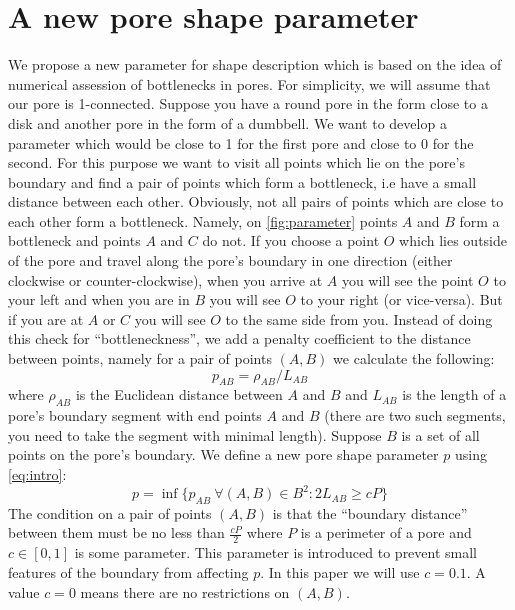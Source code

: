 \documentclass[reprint,amsmath,amssymb,aps,pre,showkeys,showpacs]{revtex4-1}
\begin{document}
\section{A new pore shape parameter}
We propose a new parameter for shape description which is based on the idea of
numerical assession of bottlenecks in pores. For simplicity, we will assume
that our pore is 1-connected. Suppose you have a round pore in the form close to
a disk and another pore in the form of a dumbbell. We want to develop a
parameter which would be close to 1 for the first pore and close to 0 for the
second. For this purpose we want to visit all points which lie on the pore's
boundary and find a pair of points which form a bottleneck, i.e have a small
distance between each other. Obviously, not all pairs of points which are close
to each other form a bottleneck. Namely, on \cref{fig:parameter} points $A$ and
$B$ form a bottleneck and points $A$ and $C$ do not. If you choose a point $O$
which lies outside of the pore and travel along the pore's boundary in one
direction (either clockwise or counter-clockwise), when you arrive at $A$ you
will see the point $O$ to your left and when you are in $B$ you will see $O$ to
your right (or vice-versa). But if you are at $A$ or $C$ you will see $O$ to the
same side from you. Instead of doing this check for ``bottleneckness'', we add a
penalty coefficient to the distance between points, namely for a pair of points
$(A, B)$ we calculate the following:
\begin{equation}
  p_{AB} = \rho_{AB} / L_{AB}
  \label{eq:intro}
\end{equation}
where $\rho_{AB}$ is the Euclidean distance between $A$ and $B$ and $L_{AB}$ is
the length of a pore's boundary segment with end points $A$ and $B$ (there are
two such segments, you need to take the segment with minimal length). Suppose
$B$ is a set of all points on the pore's boundary. We define a new pore shape
parameter $p$ using \ref{eq:intro}:
\begin{equation}
  p = \inf \{ p_{AB} \ \forall (A, B) \in B^2 : 2 L_{AB} \ge cP \}
  \label{eq:pre-awesomeness}
\end{equation}
The condition on a pair of points $(A, B)$ is that the ``boundary distance''
between them must be no less than $\frac{cP}{2}$ where $P$ is a perimeter of a
pore and $c \in [0,1]$ is some parameter. This parameter is introduced to
prevent small features of the boundary from affecting $p$. In this paper we will
use $c = 0.1$. A value $c = 0$ means there are no restrictions on $(A, B)$.
\end{document}
